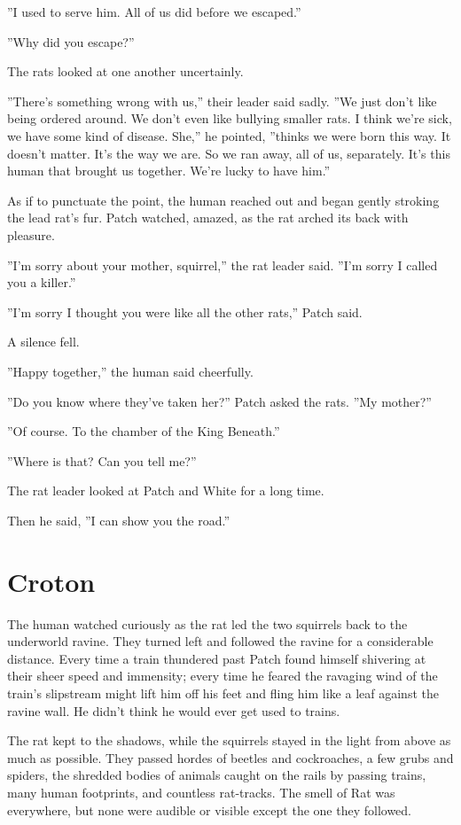 \documentclass[12pt]{book}
\begin{document}
''I used to serve him. All of us did before we escaped.''

''Why did you escape?''

The rats looked at one another uncertainly.

''There's something wrong with us,'' their leader said sadly. ''We
just don't like being ordered around. We don't even like bullying
smaller rats. I think we're sick, we have some kind of disease. She,''
he pointed, ''thinks we were born this way. It doesn't matter. It's
the way we are. So we ran away, all of us, separately. It's this human
that brought us together. We're lucky to have him.''

As if to punctuate the point, the human reached out and began gently
stroking the lead rat's fur. Patch watched, amazed, as the rat arched
its back with pleasure.

''I'm sorry about your mother, squirrel,'' the rat leader said. ''I'm
sorry I called you a killer.''

''I'm sorry I thought you were like all the other rats,'' Patch said.

A silence fell.

''Happy together,'' the human said cheerfully.

''Do you know where they've taken her?'' Patch asked the rats. ''My
mother?''

''Of course. To the chamber of the King Beneath.''

''Where is that? Can you tell me?''

The rat leader looked at Patch and White for a long time.

Then he said, ''I can show you the road.''


\section{Croton}

The human watched curiously as the rat led the two squirrels back to
the underworld ravine. They turned left and followed the ravine for a
considerable distance. Every time a train thundered past Patch found
himself shivering at their sheer speed and immensity; every time he
feared the ravaging wind of the train's slipstream might lift him off
his feet and fling him like a leaf against the ravine wall. He didn't
think he would ever get used to trains.

The rat kept to the shadows, while the squirrels stayed in the light
from above as much as possible. They passed hordes of beetles and
cockroaches, a few grubs and spiders, the shredded bodies of animals
caught on the rails by passing trains, many human footprints, and
countless rat-tracks. The smell of Rat was everywhere, but none were
audible or visible except the one they followed.
\end{document}

